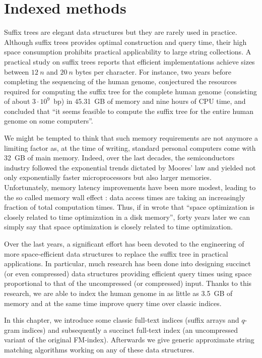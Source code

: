 \chapter{Indexed methods}
\label{chr:index}

Suffix trees are elegant data structures but they are rarely used in practice.
Although suffix trees provides optimal construction and query time, their high space consumption prohibits practical applicability to large string collections.
A practical study on suffix trees \citep{Kurtz1999} reports that efficient implementations achieve sizes between $12~n$ and $20~n$ bytes per character.
For instance, two years before completing the sequencing of the human genome, \citeauthor{Kurtz1999} conjectured the resources required for computing the suffix tree for the complete human genome (consisting of about $3 \cdot 10^9$~bp) in 45.31~GB of memory and nine hours of CPU time, and concluded that ``it seems feasible to compute the suffix tree for the entire human genome on some computers''.

We might be tempted to think that such memory requirements are not anymore a limiting factor as, at the time of writing, standard personal computers come with 32~GB of main memory.
Indeed, over the last decades, the semiconductors industry followed the exponential trends dictated by Moores' law and yielded not only exponentially faster microprocessors but also larger memories.
Unfortunately, memory latency improvements have been more modest, leading to the so called memory wall effect \citep{Wilkes1995}: data access times are taking an increasingly fraction of total computation times.
Thus, if in \citeyear{Knuth1973} \citeauthor{Knuth1973} wrote that ``space optimization is closely related to time optimization in a disk memory'', forty years later we can simply say that space optimization is closely related to time optimization.

Over the last years, a significant effort has been devoted to the engineering of more space-efficient data structures to replace the suffix tree in practical applications.
In particular, much research has been done into designing succinct (or even compressed) data structures providing efficient query times using space proportional to that of the uncompressed (or compressed) input.
Thanks to this research, we are able to index the human genome in as little as 3.5~GB of memory and at the same time improve query time over classic indices.

In this chapter, we introduce some classic full-text indices (suffix arrays and $q$-gram indices) and subsequently a succinct full-text index (an uncompressed variant of the original FM-index).
Afterwards we give generic approximate string matching algorithms working on any of these data structures.

